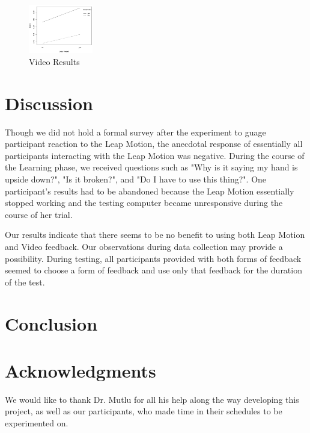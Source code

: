 \documentclass{sigchi}
\begin{document}
\begin{figure}
\centering
\includegraphics[width=0.25\textwidth]{int1.png}
\caption{Video Results}
\label{int2}
\end{figure}

\section{Discussion}

Though we did not hold a formal survey after the experiment to guage participant reaction to the Leap Motion, the anecdotal response of essentially all participants interacting with the Leap Motion was negative.  During the course of the Learning phase, we received questions such as "Why is it saying my hand is upside down?", "Is it broken?", and "Do I have to use this thing?".  One participant's results had to be abandoned because the Leap Motion essentially stopped working and the testing computer became unresponsive during the course of her trial.  

Our results indicate that there seems to be no benefit to using both Leap Motion and Video feedback.  Our observations during data collection may provide a possibility.  During testing, all participants provided with both forms of feedback seemed to choose a form of feedback and use only that feedback for the duration of the test. 

\section{Conclusion}



\section{Acknowledgments}
We would like to thank Dr. Mutlu for all his help along the way developing this project, as well as our participants, who made time in their schedules to be experimented on.

%
%
%
%
%
\balance



\end{document}

